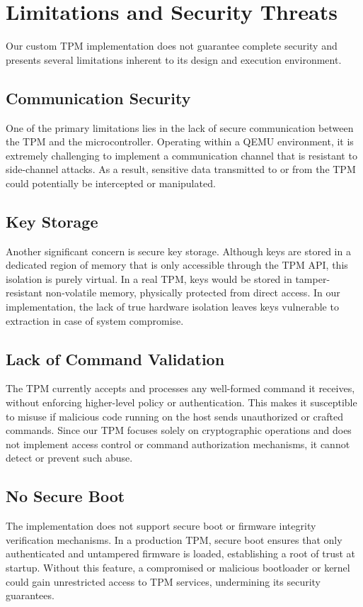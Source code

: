 \chapter{Limitations and Security Threats}
\label{chap3}

Our custom TPM implementation does not guarantee complete security and presents several limitations inherent to its design and execution environment.

\section{Communication Security}
One of the primary limitations lies in the lack of secure communication between the TPM and the microcontroller. 
Operating within a QEMU environment, it is extremely challenging to implement a communication channel that is resistant to side-channel attacks. 
As a result, sensitive data transmitted to or from the TPM could potentially be intercepted or manipulated.

\section{Key Storage}
Another significant concern is secure key storage. 
Although keys are stored in a dedicated region of memory that is only accessible through the TPM API, this isolation is purely virtual. 
In a real TPM, keys would be stored in tamper-resistant non-volatile memory, physically protected from direct access. 
In our implementation, the lack of true hardware isolation leaves keys vulnerable to extraction in case of system compromise.

\section{Lack of Command Validation}
The TPM currently accepts and processes any well-formed command it receives, without enforcing higher-level policy or authentication. 
This makes it susceptible to misuse if malicious code running on the host sends unauthorized or crafted commands. 
Since our TPM focuses solely on cryptographic operations and does not implement access control or command authorization mechanisms, 
it cannot detect or prevent such abuse.

\section{No Secure Boot}
The implementation does not support secure boot or firmware integrity verification mechanisms. 
In a production TPM, secure boot ensures that only authenticated and untampered firmware is loaded, establishing a root of trust at startup. 
Without this feature, a compromised or malicious bootloader or kernel could gain unrestricted access to TPM services, undermining its security guarantees.

